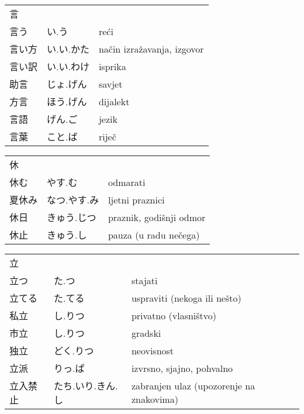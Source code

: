 

\newenvironment{dictentry}[1]{
	\begin{tabular}{p{2cm} p{3cm} p{10cm}}
		#1 &&\\
}{
	\end{tabular}
	\vspace{20pt}
}

\newcommand{\example}[3]{
	\hspace*{\fill}#1 & #2 & #3\\
}

\author{ロボット君}


\begin{dictentry}{言}
\example{言う}{い.う}{reći}
\example{言い方}{い.い.かた}{način izražavanja, izgovor}
\example{言い訳}{い.い.わけ}{isprika}
\example{助言}{じょ.げん}{savjet}
\example{方言}{ほう.げん}{dijalekt}
\example{言語}{げん.ご}{jezik}
\example{言葉}{こと.ば}{riječ}
\end{dictentry}

\begin{dictentry}{休}
\example{休む}{やす.む}{odmarati}
\example{夏休み}{なつ.やす.み}{ljetni praznici}
\example{休日}{きゅう.じつ}{praznik, godišnji odmor}
\example{休止}{きゅう.し}{pauza (u radu nečega)}
\end{dictentry}

\begin{dictentry}{立}
\example{立つ}{た.つ}{stajati}
\example{立てる}{た.てる}{uspraviti (nekoga ili nešto)}
\example{私立}{し.りつ}{privatno (vlasništvo)}
\example{市立}{し.りつ}{gradski}
\example{独立}{どく.りつ}{neovisnost}
\example{立派}{りっ.ぱ}{izvrsno, sjajno, pohvalno}
\example{立入禁止}{たち.いり.きん.し}{zabranjen ulaz (upozorenje na znakovima)}
\end{dictentry}

